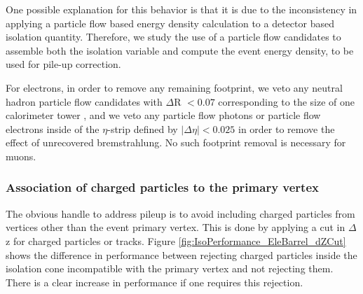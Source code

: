One possible explanation for this behavior is that it is due to the inconsistency in applying
a particle flow based energy density calculation to a detector based isolation quantity. Therefore,
we study the use of a particle flow candidates to assemble both the isolation variable and compute
the event energy density, to be used for pile-up correction.

For electrons, in order to remove any remaining footprint, we veto any neutral hadron particle flow 
candidates with $\Delta$R $ < 0.07$ corresponding to the size of one calorimeter tower , and we 
veto any particle flow photons or particle flow electrons inside of the $\eta$-strip defined by
$|\Delta\eta| < 0.025$ in order to remove the effect of unrecovered bremstrahlung. No such
footprint removal is necessary for muons. 

\subsubsection{Association of charged particles to the primary vertex}

The obvious handle to address pileup is to avoid including charged particles from vertices other than
the event primary vertex. This is done by applying a cut in $\Delta$z for 
charged particles or tracks. Figure \ref{fig:IsoPerformance_EleBarrel_dZCut} shows the difference
in performance between rejecting charged particles inside the isolation cone 
incompatible with the primary vertex and not rejecting them. There is a clear increase
in performance if one requires this rejection.


